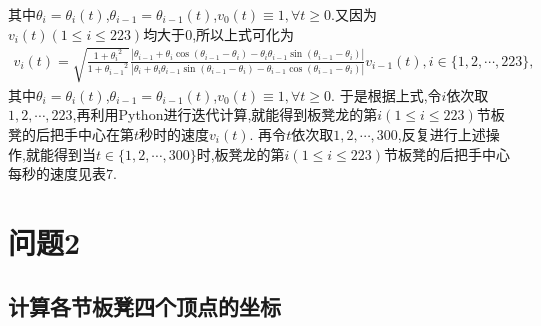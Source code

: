 \documentclass[lang=cn,newtx,10pt,scheme=chinese]{../Template/elegantbook}
\begin{document}
其中\(\theta _i = \theta _i(t)\),\(\theta _{i - 1} = \theta _{i - 1}(t)\),\(v_0(t) \equiv 1, \forall t\geqslant 0\).又因为\(v_i(t) (1\leqslant i\leqslant 223)\)均大于\(0\),所以上式可化为
\begin{align}
v_i(t) = \sqrt{\frac{1 + {\theta _i}^2}{1 + {\theta _{i - 1}}^2}}\frac{|\theta _{i - 1} + \theta _i\cos(\theta _{i - 1} - \theta _i) - \theta _i\theta _{i - 1}\sin(\theta _{i - 1} - \theta _i)|}{|\theta _i + \theta _i\theta _{i - 1}\sin(\theta _{i - 1} - \theta _i) - \theta _{i - 1}\cos(\theta _{i - 1} - \theta _i)|}v_{i - 1}(t), i\in \{1, 2, \cdots, 223\},
\end{align}
其中\(\theta _i = \theta _i(t)\),\(\theta _{i - 1} = \theta _{i - 1}(t)\),\(v_0(t) \equiv 1, \forall t\geqslant 0\).
于是根据上式,令\(i\)依次取\(1, 2, \cdots, 223\),再利用Python进行迭代计算,就能得到板凳龙的第\(i(1\leqslant i\leqslant 223)\)节板凳的后把手中心在第\(t\)秒时的速度\(v_i(t)\).
再令\(t\)依次取\(1, 2, \cdots, 300\),反复进行上述操作,就能得到当\(t\in \{1, 2, \cdots, 300\}\)时,板凳龙的第\(i(1\leqslant i\leqslant 223)\)节板凳的后把手中心每秒的速度见表\(7\).



\chapter{问题2}

\section{计算各节板凳四个顶点的坐标}
\end{document}
